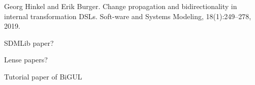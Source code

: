 \documentclass[runningheads]{llncs}
\begin{document}
\begin{thebibliography}{8}
Georg Hinkel and Erik Burger. Change propagation and bidirectionality in internal transformation DSLs. Soft-ware and Systems Modeling, 18(1):249--278, 2019.

  
  SDMLib paper?

  Lense papers?

  Tutorial paper of BiGUL
  




\end{thebibliography}

% 
\end{document}
